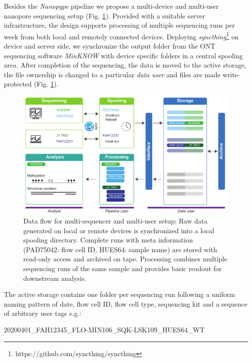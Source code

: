 Besides the \textit{Nanopype} pipeline we propose a multi-device and multi-user nanopore sequencing setup (Fig. \ref{fig:nanopype:storage}). Provided with a suitable server infrastructure, the design supports processing of multiple sequencing runs per week from both local and remotely connected devices. 
Deploying \textit{syncthing}\footnote{https://github.com/syncthing/syncthing} on device and server side, we synchronize the output folder from the ONT sequencing software \textit{MinKNOW} with device specific folders in a central spooling area.
After completion of the sequencing, the data is moved to the active storage, the file ownership is changed to a particular \textit{data user} and files are made write-protected (Fig. \ref{fig:nanopype:storage}).

\begin{figure}[h]
	\centering
	\includegraphics[width=1.0\textwidth]{figures/nanopype/storage.pdf}
	\captionsetup{format=plain}
	\caption[Nanopype data flow]{Data flow for multi-sequencer and multi-user setup: Raw data generated on local or remote devices is synchronized into a local spooling directory. Complete runs with meta information (PAD75042: flow cell ID, HUES64: sample name) are stored with read-only access and archived on tape. Processing combines multiple sequencing runs of the same sample and provides basic readout for downstream analysis.}
	\label{fig:nanopype:storage}
\end{figure}

The active storage contains one folder per sequencing run following a uniform naming pattern of date, flow cell ID, flow cell type, sequencing kit and a sequence of arbitrary user tags e.g.:

\begin{center}
	20200401\_FAH12345\_FLO-MIN106\_SQK-LSK109\_HUES64\_WT
\end{center}

